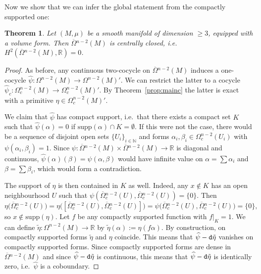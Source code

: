 \documentclass{article}
\newcommand{\R}{\mathbb{R}}
\newcommand{\supp}{\mathrm{supp}}
\newcommand{\oline}{\overline}
\newcommand{\dd}{{\tt d}}
\newtheorem{Theorem}{Theorem}[section]
\theoremstyle{definition}
\begin{document}
Now we show that we can infer the global statement from the compactly supported one:

\begin{Theorem}\label{prop:main}
    Let $(M,\mu)$ be a smooth manifold of dimension $\geq 3$, equipped with a volume form. Then 
$\oline{\Omega}{}^{n-2}(M)$ is centrally closed, i.e. $H^2(\oline{\Omega}{}^{n-2}(M),\R)=0$.
\end{Theorem}


\begin{proof}
As before, any continuous two-cocycle on $\oline{\Omega}{}^{n-2}(M)$ induces a one-cocycle $\widehat\psi:\Omega^{n-2}(M)\to \Omega^{n-2}(M)'$. We can restrict the latter to a cocycle $\widehat\psi_c:\Omega^{n-2}_c(M)\to \Omega^{n-2}_c(M)'$. By Theorem~\ref{prop:mainc} the latter is exact with a primitive $\eta\in \Omega^{n-2}_c(M)'$.

We claim that $\widehat \psi$ has compact support, i.e.\ that there exists a compact set $K$ such that $\hat\psi(\alpha)=0$ if ${\supp(\alpha)\cap K}=\emptyset$. If this were not the case, there would be a sequence of disjoint open sets $\{U_i\}_{i\in \mathbb N}$ and forms $\alpha_i,\beta_i\in\Omega^{n-2}_c(U_i)$ with $\psi(\alpha_i,\beta_i)=1$. Since $\psi \colon \oline{\Omega}{}^{n-2}(M) \times \oline{\Omega}{}^{n-2}(M) \rightarrow \R$ is diagonal and continuous, $\widehat\psi(\alpha)(\beta) = \psi(\alpha,\beta)$ would have infinite value on $\alpha=\sum \alpha_i$ and $\beta=\sum\beta_i$, which would form a contradiction.

The support of $\eta$ is then contained in $K$ as well. Indeed, any $x\notin K$ has an open neighbourhood $U$ such that 
$\psi(\oline{\Omega}{}^{n-2}_{c}(U), \oline{\Omega}{}^{n-2}_{c}(U)) = \{0\}$. Then 
\[
	\eta\big(\oline{\Omega}{}^{n-2}_{c}(U)\big) = \eta\big([\oline{\Omega}{}^{n-2}_{c}(U), \oline{\Omega}{}^{n-2}_{c}(U)]\big) =  
	\psi\big(\oline{\Omega}{}^{n-2}_{c}(U), \oline{\Omega}{}^{n-2}_{c}(U)\big) = \{0\},
\] 
so $x\notin \mathrm{supp}(\eta)$.
 Let $f$ be any compactly supported function with $f|_K=1$. We can define $\tilde\eta: \Omega^{n-2}(M)\to \R$ by $\tilde\eta(\alpha):=\eta(f\alpha)$. By construction, on compactly supported forms $\tilde \eta$ and $\eta$ coincide. This means that $\widehat \psi - \dd \tilde \eta$ vanishes on compactly supported forms. Since compactly supported forms  are dense in $\oline{\Omega}{}^{n-2}(M)$ and since $\widehat \psi - \dd \tilde \eta$ is continuous,
 this means that $\widehat \psi - \dd \tilde \eta$ is identically zero, i.e.\ $\widehat\psi$ is a coboundary.
\end{proof}
\end{document}
